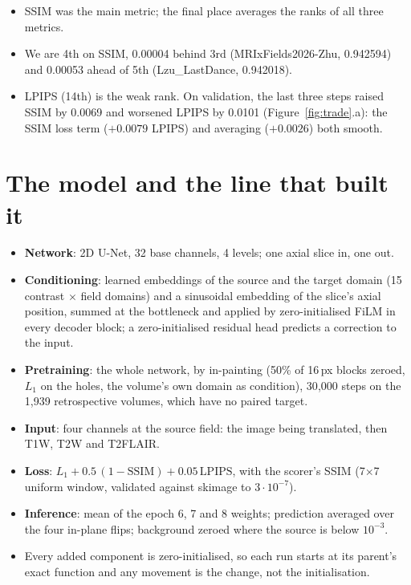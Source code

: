 \documentclass[10pt,a4paper]{article}
\begin{document}
\begin{itemize}
  \item SSIM was the main metric; the final place averages the ranks of all three metrics.
  \item We are 4th on SSIM, 0.00004 behind 3rd (MRIxFields2026-Zhu, 0.942594) and 0.00053 ahead
        of 5th (Lzu\_LastDance, 0.942018).
  \item LPIPS (14th) is the weak rank. On validation, the last three steps raised SSIM by 0.0069
        and worsened LPIPS by 0.0101 (Figure~\ref{fig:trade}.a): the SSIM loss term ($+0.0079$
        LPIPS) and averaging ($+0.0026$) both smooth.
\end{itemize}

\section{The model and the line that built it}\label{sec:model}

\begin{itemize}
  \item \textbf{Network}: 2D U-Net, 32 base channels, 4 levels; one axial slice in, one out.
  \item \textbf{Conditioning}: learned embeddings of the source and the target domain (15
        contrast $\times$ field domains) and a sinusoidal embedding of the slice's axial
        position, summed at the bottleneck and applied by zero-initialised FiLM in every decoder
        block; a zero-initialised residual head predicts a correction to the input.
  \item \textbf{Pretraining}: the whole network, by in-painting (50\% of 16\,px blocks zeroed,
        $L_1$ on the holes, the volume's own domain as condition), 30{,}000 steps on the 1{,}939
        retrospective volumes, which have no paired target.
  \item \textbf{Input}: four channels at the source field: the image being translated, then T1W,
        T2W and T2FLAIR.
  \item \textbf{Loss}: $L_1 + 0.5\,(1-\mathrm{SSIM}) + 0.05\,\mathrm{LPIPS}$, with the scorer's
        SSIM (7$\times$7 uniform window, validated against skimage to $3\cdot10^{-7}$).
  \item \textbf{Inference}: mean of the epoch 6, 7 and 8 weights; prediction averaged over the four
        in-plane flips; background zeroed where the source is below $10^{-3}$.
  \item Every added component is zero-initialised, so each run starts at its parent's exact
        function and any movement is the change, not the initialisation.
\end{itemize}
\end{document}
